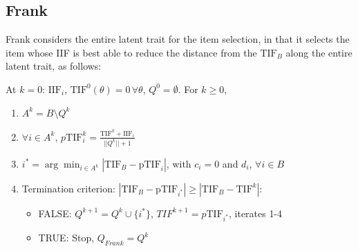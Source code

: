 \documentclass{svproc}
\begin{document}
\subsection{Frank}



Frank considers the entire latent trait for the item selection, in that it selects the item whose IIF is best able to reduce the distance from the $\text{TIF}_B$ along the entire latent trait, as follows:


At $k = 0$: $\text{IIF}_i$, $\text{TIF}^0(\theta) = 0 \, \forall \theta$, $Q^0 = \emptyset$. For $k \geq 0$,

\begin{enumerate}
	\item  $A^k = B \setminus Q^k$ 
	\item $\forall i \in A^k$, $p\text{TIF}_{i}^k = \frac{\text{TIF}^k + \text{IIF}_{i}}{||Q^k||+1}$
	\item $i^* = \arg \min_{i \in A^k} |\text{TIF}_B - \text{pTIF}_i|$, with $c_i = 0$ and $d_i$, $\forall i \in B$
	\item Termination criterion: $|\text{TIF}_B - \text{pTIF}_{i^*}| \geq |\text{TIF}_B - \text{TIF}^{k}|$: 
	\begin{itemize}
		\item FALSE:  $Q^{k+1} = Q^{k} \cup \{i^*\}$, $TIF^{k+1} = p\text{TIF}_{i^*}$, iterates 1-4 
		\item TRUE: Stop, %
		$Q_{Frank} = Q^k$
		
	\end{itemize}
\end{enumerate}
\end{document}
